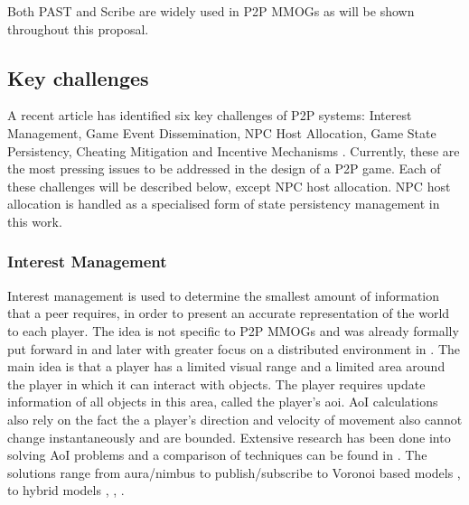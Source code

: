 \documentclass[journal,oneside,a4paper,onecolumn]{IEEEtran}
\begin{document}
Both PAST and Scribe are widely used in P2P MMOGs as will be shown throughout this proposal.

\subsection{Key challenges}
\label{key_challenges}

A recent article has identified six key challenges of P2P systems: Interest Management, Game Event Dissemination, NPC Host Allocation, Game State Persistency, Cheating Mitigation and Incentive Mechanisms \cite{Fan_deisgn_issues_p2p}. Currently, these are the most pressing issues to be addressed in the design of a P2P game. Each of these challenges will be described below, except NPC host allocation. NPC host allocation is handled as a specialised form of state persistency management in this work.



\subsubsection{Interest Management}
\label{key_challenges_im}

Interest management is used to determine the smallest amount of information that a peer requires, in order to present an accurate representation of the world to each player. The idea is not specific to P2P MMOGs and was already formally put forward in \cite{First_IM} and later with greater focus on a distributed environment in \cite{Whang_agent_based_IM}. The main idea is that a player has a limited visual range and a limited area around the player in which it can interact with objects. The player requires update information of all objects in this area, called the player's \ac{aoi}. AoI calculations also rely on the fact the a player's direction and velocity of movement also cannot change instantaneously and are bounded. Extensive research has been done into solving AoI problems and a comparison of techniques can be found in \cite{Boulanger_IM_compare}. The solutions range from aura/nimbus \cite{Benford_spatial_IM} to publish/subscribe \cite{mercury_publish_subscribe} to Voronoi based models \cite{Hu_voronoi_IM}, \cite{Buyukkaya_voronoi_state_management} to hybrid models \cite{hybrid_IM}, \cite{MOPAR}, \cite{fan_mediator_paper}.
\end{document}
